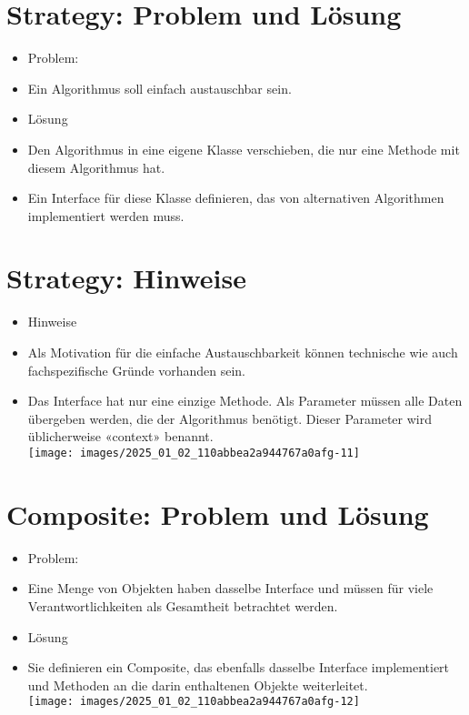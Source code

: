 \documentclass[10pt]{article}
\begin{document}
\section*{Strategy: Problem und Lösung}
\begin{itemize}
  \item Problem:
  \item Ein Algorithmus soll einfach austauschbar sein.
  \item Lösung
  \item Den Algorithmus in eine eigene Klasse verschieben, die nur eine Methode mit diesem Algorithmus hat.
  \item Ein Interface für diese Klasse definieren, das von alternativen Algorithmen implementiert werden muss.
\end{itemize}

\section*{Strategy: Hinweise}
\begin{itemize}
  \item Hinweise
  \item Als Motivation für die einfache Austauschbarkeit können technische wie auch fachspezifische Gründe vorhanden sein.
  \item Das Interface hat nur eine einzige Methode. Als Parameter müssen alle Daten übergeben werden, die der Algorithmus benötigt. Dieser Parameter wird üblicherweise «context» benannt.\\
\texttt{[image: images/2025\_01\_02\_110abbea2a944767a0afg-11]}
\end{itemize}

\section*{Composite: Problem und Lösung}
\begin{itemize}
  \item Problem:
  \item Eine Menge von Objekten haben dasselbe Interface und müssen für viele Verantwortlichkeiten als Gesamtheit betrachtet werden.
  \item Lösung
  \item Sie definieren ein Composite, das ebenfalls dasselbe Interface implementiert und Methoden an die darin enthaltenen Objekte weiterleitet.\\
\texttt{[image: images/2025\_01\_02\_110abbea2a944767a0afg-12]}
\end{itemize}
\end{document}
